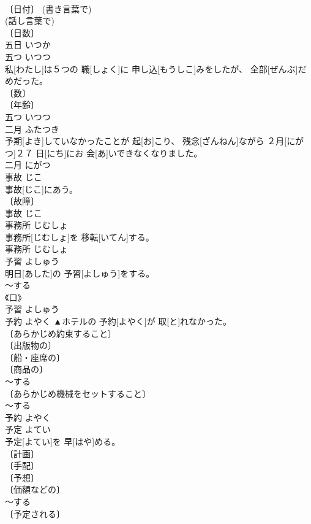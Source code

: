 \documentclass[8pt]{extreport}
\begin{document}
\begin{CJK}{UTF8}{min}
\\	〔日付〕 (書き言葉で) 
\\	(話し言葉で) 
\\	〔日数〕 
\\	五日	いつか	
\\	五つ	いつつ	
\\	私[わたし]は５つの 職[しょく]に 申し込[もうしこ]みをしたが、 全部[ぜんぶ]だめだった。	
\\	〔数〕 
\\	〔年齢〕 
\\	五つ	いつつ	
\\	二月	ふたつき	
\\	予期[よき]していなかったことが 起[お]こり、 残念[ざんねん]ながら ２月[にがつ]２７ 日[にち]にお 会[あ]いできなくなりました。	
\\	二月	にがつ	
\\	事故	じこ	
\\	事故[じこ]にあう。	
\\	〔故障〕 
\\	事故	じこ	
\\	事務所	じむしょ	
\\	事務所[じむしょ]を 移転[いてん]する。	
\\	事務所	じむしょ	
\\	予習	よしゅう	
\\	明日[あした]の 予習[よしゅう]をする。	
\\	～する 
\\	《口》 
\\	予習	よしゅう	
\\	予約	よやく	▲ホテルの 予約[よやく]が 取[と]れなかった。	
\\	〔あらかじめ約束すること〕 
\\	〔出版物の〕 
\\	〔船・座席の〕 
\\	〔商品の〕 
\\	～する 
\\	〔あらかじめ機械をセットすること〕 
\\	～する 
\\	予約	よやく	
\\	予定	よてい	
\\	予定[よてい]を 早[はや]める。	
\\	〔計画〕 
\\	〔手配〕 
\\	〔予想〕 
\\	〔価額などの〕 
\\	～する 
\\	〔予定される〕 

\end{CJK}
\end{document}
